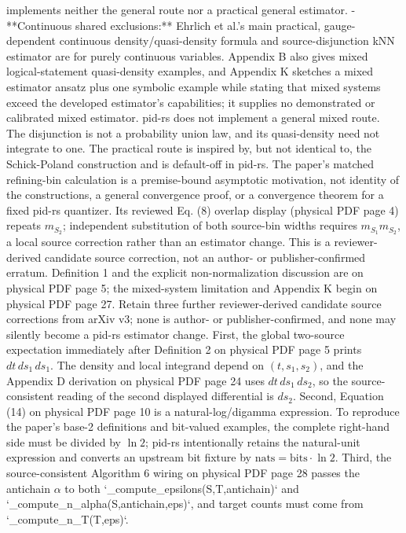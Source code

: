 \documentclass[11pt]{article}
\begin{document}
\begin{markdown}
  implements neither the general route nor a practical general estimator.
- **Continuous shared exclusions:** Ehrlich et al.'s main practical, gauge-dependent continuous
  density/quasi-density formula and source-disjunction kNN estimator are for purely continuous
  variables. Appendix B also gives mixed logical-statement quasi-density examples, and Appendix K
  sketches a mixed estimator ansatz plus one symbolic example while stating that mixed systems
  exceed the developed estimator's capabilities; it supplies no demonstrated or calibrated mixed
  estimator. pid-rs does not implement a general mixed route. The disjunction is not a probability union law,
  and its quasi-density need not integrate to one. The practical route is inspired by, but not
  identical to, the Schick-Poland construction and is default-off in pid-rs. The
  paper's matched refining-bin calculation is a premise-bound asymptotic motivation, not identity
  of the constructions, a general convergence proof, or a convergence theorem for a fixed pid-rs
  quantizer. Its reviewed Eq. (8) overlap display (physical PDF page 4) repeats $m_{S_2}$;
  independent substitution of both source-bin widths requires $m_{S_1}m_{S_2}$, a local source
  correction rather than an estimator change. This is a reviewer-derived candidate source
  correction, not an author- or publisher-confirmed erratum. Definition 1 and the explicit
  non-normalization discussion are on physical PDF page 5; the mixed-system limitation and
  Appendix K begin on physical PDF page 27.
  Retain three further reviewer-derived candidate source corrections from arXiv v3; none is
  author- or publisher-confirmed, and none may silently become a pid-rs estimator change. First,
  the global two-source expectation immediately after Definition 2 on
  physical PDF page 5 prints $dt\,ds_1\,ds_1$. The density and local integrand depend on
  $(t,s_1,s_2)$, and the Appendix D derivation on physical PDF page 24 uses
  $dt\,ds_1\,ds_2$, so the source-consistent reading of the second displayed differential is
  $ds_2$. Second, Equation (14) on
  physical PDF page 10 is a natural-log/digamma expression. To reproduce the paper's base-2
  definitions and bit-valued examples, the complete right-hand side must be divided by $\ln 2$;
  pid-rs intentionally retains the natural-unit expression and converts an upstream bit fixture by
  $\text{nats}=\text{bits}\cdot\ln 2$. Third, the source-consistent Algorithm 6 wiring on physical
  PDF page 28 passes the antichain $\alpha$ to both `_compute_epsilons(S,T,antichain)` and
  `_compute_n_alpha(S,antichain,eps)`, and target counts must come from `_compute_n_T(T,eps)`.

\end{markdown}
\end{document}
